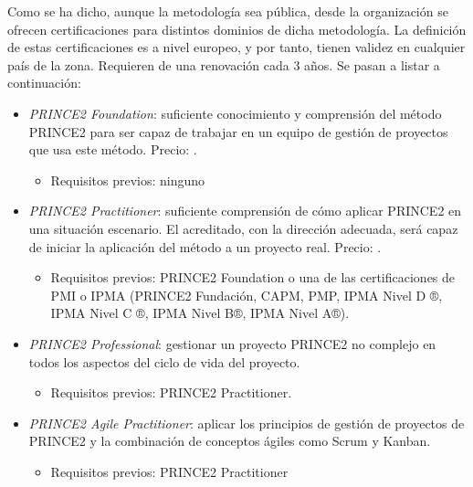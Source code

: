 Como se ha dicho, aunque la metodología sea pública, desde la organización se ofrecen certificaciones para distintos dominios de dicha metodología. La definición de estas certificaciones es a nivel europeo, y por tanto, tienen validez en cualquier país de la zona. Requieren de una renovación cada 3 años. Se pasan a listar a continuación:
\begin{itemize}
	\item \emph{PRINCE2 Foundation}: suficiente conocimiento y comprensión del método PRINCE2 para ser capaz de trabajar en un equipo de gestión de proyectos que usa este método. Precio: .
	\begin{itemize}
		\item Requisitos previos: ninguno
	\end{itemize}
	\item \emph{PRINCE2 Practitioner}: suficiente comprensión de cómo aplicar PRINCE2 en una situación escenario. El acreditado, con la dirección adecuada, será capaz de iniciar la aplicación del método a un proyecto real. Precio: .
	\begin{itemize}
		\item Requisitos previos: PRINCE2 Foundation o una de las certificaciones de PMI o IPMA (PRINCE2 Fundación, CAPM, PMP, IPMA Nivel D ®, IPMA Nivel C ®, IPMA Nivel B®, IPMA Nivel A®).
	\end{itemize}
	\item \emph{PRINCE2 Professional}: gestionar un proyecto PRINCE2 no complejo en todos los aspectos del ciclo de vida del proyecto.
	\begin{itemize}
		\item Requisitos previos: PRINCE2 Practitioner.
	\end{itemize}
	\item \emph{PRINCE2 Agile Practitioner}: aplicar los principios de gestión de proyectos de PRINCE2 y la combinación de conceptos ágiles como Scrum y Kanban.
	\begin{itemize}
		\item Requisitos previos: PRINCE2 Practitioner
	\end{itemize}
\end{itemize}